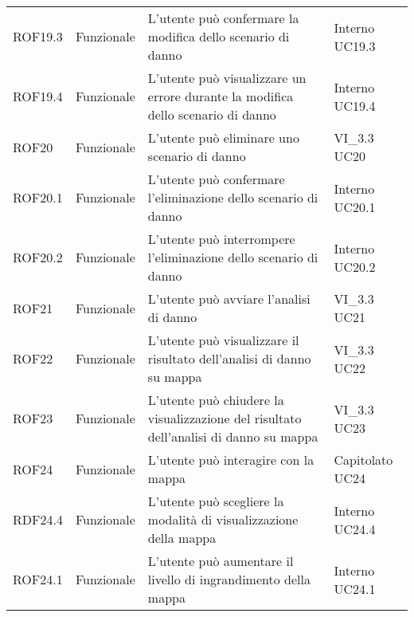 \begin{longtable}{p{2cm}!{\VRule[1pt]}p{2cm}!{\VRule[1pt]}p{5cm}!{\VRule[1pt]}p{1.5cm}}
 \\
ROF19.3&Funzionale\newline  & L'utente può confermare la modifica dello scenario di danno & Interno \newline UC19.3
 \\
ROF19.4&Funzionale\newline  & L'utente può visualizzare un errore durante la modifica dello scenario di danno & Interno \newline UC19.4
 \\
ROF20&Funzionale\newline  & L'utente può eliminare uno scenario di danno & VI_3.3 \newline UC20
 \\
ROF20.1&Funzionale\newline  & L'utente può confermare l'eliminazione dello scenario di danno & Interno \newline UC20.1
 \\
ROF20.2&Funzionale\newline  & L'utente può interrompere l'eliminazione dello scenario di danno & Interno \newline UC20.2
 \\
ROF21&Funzionale\newline  & L'utente può avviare l'analisi di danno & VI_3.3 \newline UC21
 \\
ROF22&Funzionale\newline  & L'utente può visualizzare il risultato dell'analisi di danno su mappa & VI_3.3 \newline UC22
 \\
ROF23&Funzionale\newline  & L'utente può chiudere la visualizzazione del risultato dell'analisi di danno su mappa & VI_3.3 \newline UC23
 \\
ROF24&Funzionale\newline  & L'utente può interagire con la mappa & Capitolato \newline UC24
 \\
RDF24.4&Funzionale\newline  & L'utente può scegliere la  modalità di visualizzazione della mappa & Interno \newline UC24.4
 \\
ROF24.1&Funzionale\newline  & L'utente può aumentare il livello di ingrandimento della mappa & Interno \newline UC24.1

\end{longtable}
